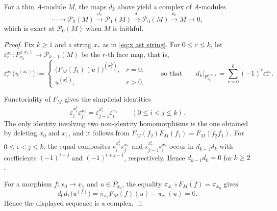 \documentclass[a4paper,leqno]{amsart}
\begin{document}
\begin{prop}\label{prop:cpx from module}
For a thin $A$-module $M$, the maps $d_k$ above yield a complex of $A$-modules
\begin{equation*}
\cdots\longrightarrow\mathcal P_2(M)
\xrightarrow{d_2}\mathcal P_1(M)
\xrightarrow{d_1}\mathcal P_0(M)
\xrightarrow{d_0}M\to 0,
\end{equation*}
which is exact at $\mathcal{P}_0(M)$ when $M$ is faithful.
\end{prop}

\begin{proof}
Fix $k\geq1$ and a string $x_\ast$ as in \eqref{eq:x ast string}. For $0\leq r\leq k$, let $\varepsilon_r^{x_\ast}\colon P_{x_0}^{(x_\ast)}\to\mathcal P_{k-1}(M)$ be the $r$-th face map, that is,
\begin{equation}\label{eq:general face map}
\varepsilon_r^{x_\ast}\bigl(u^{(x_\ast)}\bigr):=\begin{cases}\bigl(F_M(f_1)(u)\bigr)^{(x_\ast^{\widehat0})},&r=0,\\[1mm]u^{(x_\ast^{\widehat r})},&r>0,\end{cases}
\qquad\text{so that}\qquad
d_k\big|_{P_{x_0}^{(x_\ast)}}=\sum_{r=0}^k(-1)^r\varepsilon_r^{x_\ast}.
\end{equation}

Functoriality of $F_M$ gives the simplicial identities
\begin{equation*}
\varepsilon_i^{x_\ast^{\widehat j}}
\varepsilon_j^{x_\ast}
=
\varepsilon_{j-1}^{x_\ast^{\widehat i}}
\varepsilon_i^{x_\ast}
\qquad
(0\leq i<j\leq k).
\end{equation*}
The only identity involving two non-identity homomorphisms is the one obtained by deleting $x_0$ and $x_1$, and it follows from $F_M(f_2)F_M(f_1)=F_M(f_2f_1)$.  For $0\leq i<j\leq k$, the equal composites $\varepsilon_i^{x_\ast^{\widehat j}}\varepsilon_j^{x_\ast}$ and $\varepsilon_{j-1}^{x_\ast^{\widehat i}}\varepsilon_i^{x_\ast}$ occur in $d_{k-1}d_k$ with coefficients $(-1)^{i+j}$ and $(-1)^{i+j-1}$, respectively. Hence $d_{k-1}d_k=0$ for $k\geq2$.

For a morphism $f:x_0\to x_1$ and $u\in P_{x_0}$, the equality $\pi_{x_1}\circ F_M(f)=\pi_{x_0}$ gives
\[
d_0d_1\bigl(u^{(f)}\bigr)
=
\pi_{x_1}F_M(f)(u)-\pi_{x_0}(u)=0.
\]
Hence the displayed sequence is a complex.


\end{proof}
\end{document}
